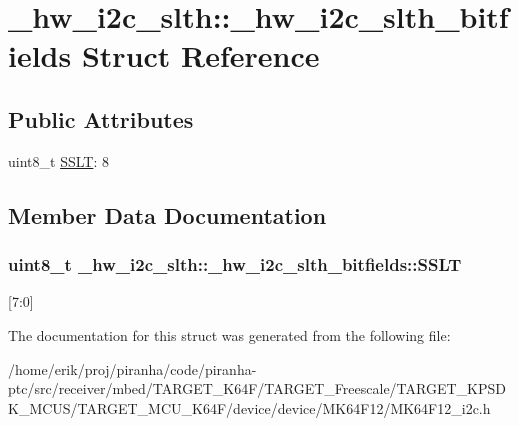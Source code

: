 \hypertarget{struct__hw__i2c__slth_1_1__hw__i2c__slth__bitfields}{}\section{\+\_\+hw\+\_\+i2c\+\_\+slth\+:\+:\+\_\+hw\+\_\+i2c\+\_\+slth\+\_\+bitfields Struct Reference}
\label{struct__hw__i2c__slth_1_1__hw__i2c__slth__bitfields}
\subsection*{Public Attributes}
\begin{DoxyCompactItemize}
\item 
uint8\+\_\+t \hyperlink{struct__hw__i2c__slth_1_1__hw__i2c__slth__bitfields_aaff3803f9290cd7a1eb6d3530bac10f9}{S\+S\+LT}\+: 8
\end{DoxyCompactItemize}


\subsection{Member Data Documentation}
\subsubsection[{\texorpdfstring{S\+S\+LT}{SSLT}}]{\setlength{\rightskip}{0pt plus 5cm}uint8\+\_\+t \+\_\+hw\+\_\+i2c\+\_\+slth\+::\+\_\+hw\+\_\+i2c\+\_\+slth\+\_\+bitfields\+::\+S\+S\+LT}\hypertarget{struct__hw__i2c__slth_1_1__hw__i2c__slth__bitfields_aaff3803f9290cd7a1eb6d3530bac10f9}{}\label{struct__hw__i2c__slth_1_1__hw__i2c__slth__bitfields_aaff3803f9290cd7a1eb6d3530bac10f9}
\mbox{[}7\+:0\mbox{]} 

The documentation for this struct was generated from the following file\+:\begin{DoxyCompactItemize}
\item 
/home/erik/proj/piranha/code/piranha-\/ptc/src/receiver/mbed/\+T\+A\+R\+G\+E\+T\+\_\+\+K64\+F/\+T\+A\+R\+G\+E\+T\+\_\+\+Freescale/\+T\+A\+R\+G\+E\+T\+\_\+\+K\+P\+S\+D\+K\+\_\+\+M\+C\+U\+S/\+T\+A\+R\+G\+E\+T\+\_\+\+M\+C\+U\+\_\+\+K64\+F/device/device/\+M\+K64\+F12/M\+K64\+F12\+\_\+i2c.\+h\end{DoxyCompactItemize}
